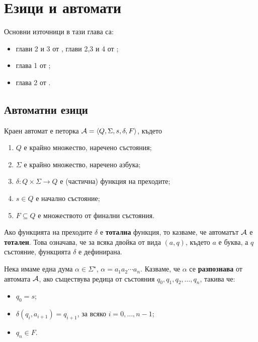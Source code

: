 \chapter{Езици и автомати}

Основни източници в тази глава са:
\begin{itemize}
\item 
  глави 2 и 3 от \cite{hopcroft1}, глави 2,3 и 4 от \cite{hopcroft2};
\item
  глава 1 от \cite{sipser};
\item
  глава 2 от \cite{papadimitriou}.
\end{itemize}

\section{Автоматни езици}

\begin{dfn}
  Краен автомат е петорка $\mathcal{A} = \langle{Q,\Sigma,s,\delta,F}\rangle$, където
  \begin{enumerate}[1)]
  \item
    $Q$ е крайно множество, наречено състояния;
  \item
    $\Sigma$ е крайно множество, наречено азбука;
  \item
    $\delta:Q\times\Sigma\to Q$ е (частична) функция на преходите;
  \item
    $s\in Q$ е начално състояние;
  \item
    $F\subseteq Q$ е множеството от финални състояния.
  \end{enumerate}
\end{dfn}

Ако функцията на преходите $\delta$ е {\bf тотална} функция, то казваме, 
че автоматът $\mathcal{A}$ е {\bf тотален}. Това означава, че за всяка двойка от вида $(a,q)$,
където $a$ е буква, а $q$ състояние, функцията $\delta$ е дефинирана.

Нека имаме една дума $\alpha \in \Sigma^\star$, $\alpha = a_1a_2\cdots a_n$.
Казваме, че $\alpha$ се {\bf разпознава} от автомата $\mathcal{A}$, ако
съществува редица от състояния $q_0,q_1,q_2,\dots,q_n$, такива че:
\begin{itemize}
\item
  $q_0 = s$;
\item
  $\delta(q_i,a_{i+1}) = q_{i+1}$, за всяко $i = 0, \dots, n-1$;
\item
  $q_n \in F$.
\end{itemize}

